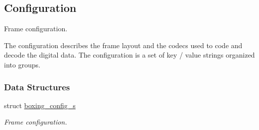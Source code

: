 \hypertarget{group__config}{
\subsection{Configuration}
\label{group__config}
}


Frame configuration.

The configuration describes the frame layout and the codecs used to code and decode the digital data. The configuration is a set of key / value strings organized into groups.  
\subsubsection*{Data Structures}
\begin{DoxyCompactItemize}
\item 
struct \hyperlink{structboxing__config__s}{boxing\_\-config\_\-s}
\begin{DoxyCompactList}\small\item\em Frame configuration. \item\end{DoxyCompactList}\end{DoxyCompactItemize}
